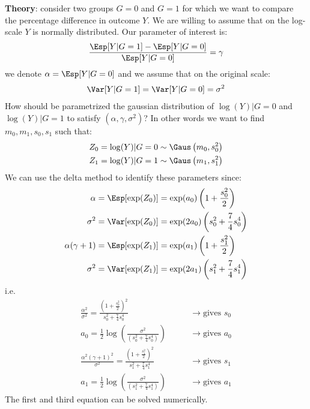\documentclass[12pt]{article}
\begin{document}
\textbf{Theory}: consider two groups \(G=0\) and \(G=1\) for which we
want to compare the percentage difference in outcome \(Y\). We are
willing to assume that on the log-scale \(Y\) is normally
distributed. Our parameter of interest is:
\begin{align*}
\frac{\Esp[Y|G=1]-\Esp[Y|G=0]}{\Esp[Y|G=0]} = \gamma
\end{align*}
we denote \(\alpha = \Esp[Y|G=0]\) and we assume that on the original scale:
\begin{align*}
\Var[Y|G=1]  = \Var[Y|G=0] = \sigma^2
\end{align*}
How should be parametrized the gaussian distribution of
\(\log(Y)|G=0\) and \(\log(Y)|G=1\) to satisfy
\((\alpha,\gamma,\sigma^2)\)? In other words we want to find
\(m_0,m_1,s_0,s_1\) such that:
\begin{align*}
Z_0 = \log(Y)|G=0 &\sim \Gaus\left(m_0,s^2_0\right) \\
Z_1 = \log(Y)|G=1 &\sim \Gaus\left(m_1,s^2_1\right) 
\end{align*}
We can use the delta method to identify these parameters since:
\begin{align*}
\alpha &= \Esp[\exp(Z_0)] = \exp(a_0)\left(1 + \frac{s^2_0}{2}\right) \\
\sigma^2 &= \Var[\exp(Z_0)] = \exp(2 a_0)\left(s^2_0 + \frac{7}{4}s^4_0\right) \\
\alpha (\gamma + 1) &= \Esp[\exp(Z_1)] = \exp(a_1)\left(1 + \frac{s^2_1}{2}\right)\\
\sigma^2 &= \Var[\exp(Z_1)] = \exp(2 a_1)\left(s^2_1 + \frac{7}{4}s^4_1\right)
\end{align*}
i.e.
\begin{align*}
\frac{\alpha^2}{\sigma^2} = \frac{\left(1+\frac{s_0^2}{2}\right)^2}{s^2_0 + \frac{7}{4}s^4_0}            \qquad &\rightarrow \text{gives } s_0 \\
a_0 = \frac{1}{2}\log\left(\frac{\sigma^2}{\left(s^2_0 + \frac{7}{4}s^4_0\right)}\right)                \qquad &\rightarrow \text{gives } a_0 \\
\frac{\alpha^2(\gamma+1)^2}{\sigma^2} = \frac{\left(1+\frac{s_1^2}{2}\right)^2}{s^2_1 + \frac{7}{4}s^4_1}\qquad &\rightarrow \text{gives } s_1 \\
a_1 = \frac{1}{2}\log\left(\frac{\sigma^2}{\left(s^2_1 + \frac{7}{4}s^4_1\right)}\right)                \qquad &\rightarrow \text{gives } a_1 
\end{align*}
The first and third equation can be solved numerically.

\clearpage
\end{document}
